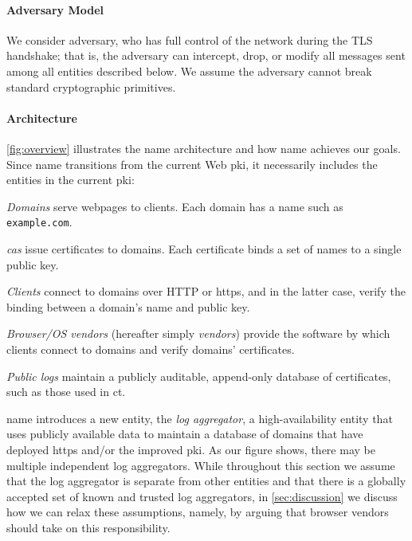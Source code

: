\paragraph{Adversary Model}
We consider  adversary, 
who has full
control of the network during the TLS handshake; that is, the adversary can
intercept, drop, or modify all messages sent among all entities described
below. We assume the adversary cannot break standard cryptographic primitives.

\paragraph{Architecture}
\autoref{fig:overview} illustrates the \ac{name} architecture and how \ac{name}
achieves our goals. Since \ac{name} transitions from the current
Web \ac{pki}, it necessarily includes the entities in the current \ac{pki}:
\begin{compactitem}
\item \emph{Domains} serve webpages to clients. Each domain has a name such as
  \texttt{example.com}.
\item \emph{\acp{ca}} issue certificates to domains. Each certificate binds a
  set of names to a single public key.
\item \emph{Clients} connect to domains over HTTP or \ac{https}, and in the
  latter case, verify the binding between a domain's name and public key.
\item \emph{Browser/OS vendors} (hereafter simply \emph{vendors}) provide the
  software by which clients connect to domains and verify domains' certificates.
\item \emph{Public logs} maintain a publicly auditable, append-only database of
  certificates, such as those used in \ac{ct}.
\end{compactitem}
\ac{name} introduces a new entity, the \emph{log aggregator}, a
high-availability entity that uses publicly available data to maintain a
database of domains that have deployed \ac{https} and/or the improved \ac{pki}.
As our figure shows, there may be multiple independent log aggregators. While
throughout this section we assume that the log aggregator is separate from other
entities and that there is a globally accepted set of known and trusted log
aggregators, in \autoref{sec:discussion} we discuss how we can relax these
assumptions, namely, by arguing that browser vendors should take on this
responsibility.

